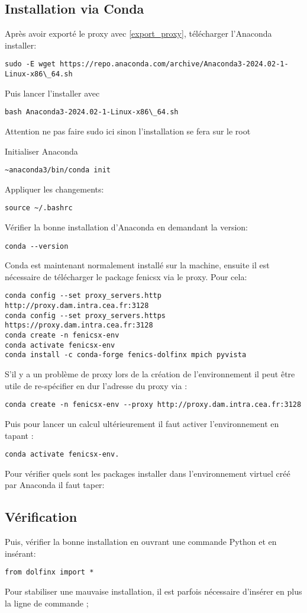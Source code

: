 \documentclass[10pt]{book}
\begin{document}
\subsection{Installation via Conda}\label{Subsection:Conda}
Après avoir exporté le proxy avec \eqref{export_proxy}, télécharger l'Anaconda installer:
\begin{verbatim}
sudo -E wget https://repo.anaconda.com/archive/Anaconda3-2024.02-1-Linux-x86\_64.sh
\end{verbatim}
Puis lancer l'installer avec
\begin{verbatim}
bash Anaconda3-2024.02-1-Linux-x86\_64.sh
\end{verbatim}
\begin{Rem}{Attention ne pas faire sudo ici sinon l'installation se fera sur le root}\end{Rem}
Initialiser Anaconda
\begin{verbatim}
~anaconda3/bin/conda init
\end{verbatim}
Appliquer les changements:
\begin{verbatim}
source ~/.bashrc
\end{verbatim}
Vérifier la bonne installation d'Anaconda en demandant la version:
\begin{verbatim}
conda --version
\end{verbatim}
Conda est maintenant normalement installé sur la machine, ensuite il est nécessaire de télécharger le package fenicsx via le proxy. Pour cela:
\begin{verbatim}
conda config --set proxy_servers.http http://proxy.dam.intra.cea.fr:3128
conda config --set proxy_servers.https https://proxy.dam.intra.cea.fr:3128
conda create -n fenicsx-env
conda activate fenicsx-env
conda install -c conda-forge fenics-dolfinx mpich pyvista
\end{verbatim}
S'il y a un problème de proxy lors de la création de l'environnement il peut être utile de re-spécifier en dur l'adresse du proxy via :
\begin{verbatim}
conda create -n fenicsx-env --proxy http://proxy.dam.intra.cea.fr:3128
\end{verbatim}
Puis pour lancer un calcul ultérieurement il faut activer l'environnement en tapant :
\begin{verbatim}
conda activate fenicsx-env.
\end{verbatim}
Pour vérifier quels sont les packages installer dans l'environnement virtuel créé par Anaconda il faut taper:
\subsection{Vérification}
Puis, vérifier la bonne installation en ouvrant une commande Python et en insérant:
\begin{verbatim}
from dolfinx import *
\end{verbatim}
\begin{Rem}{Pour stabiliser une mauvaise installation, il est parfois nécessaire d’insérer en plus la ligne de commande ;
}\end{Rem}
\end{document}
